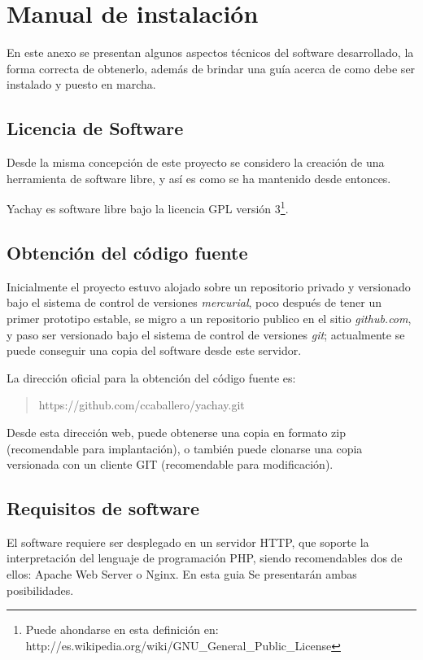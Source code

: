 \chapter{Manual de instalación}
En este anexo se presentan algunos aspectos técnicos del software desarrollado,
la forma correcta de obtenerlo, además de brindar una guía acerca de como debe
ser instalado y puesto en marcha.

\section{Licencia de Software}
Desde la misma concepción de este proyecto se considero la creación de una
herramienta de software libre, y así es como se ha mantenido desde entonces.

Yachay es software libre bajo la licencia GPL versión 3\footnote{Puede ahondarse
en esta definición en:
http://es.wikipedia.org/wiki/GNU\_General\_Public\_License}.

\section{Obtención del código fuente}
Inicialmente el proyecto estuvo alojado sobre un repositorio privado y
versionado bajo el sistema de control de versiones \emph{mercurial}, poco
después de tener un primer prototipo estable, se migro a un repositorio
publico en el sitio \emph{github.com}, y paso ser versionado bajo el sistema de
control de versiones \emph{git}; actualmente se puede conseguir una copia del
software desde este servidor.

La dirección oficial para la obtención del código fuente es:
\begin{quote}
https://github.com/ccaballero/yachay.git
\end{quote}

Desde esta dirección web, puede obtenerse una copia en formato zip
(recomendable para implantación), o también puede clonarse una copia versionada
con un cliente GIT (recomendable para modificación).

\section{Requisitos de software}
El software requiere ser desplegado en un servidor HTTP, que soporte la
interpretación del lenguaje de programación PHP, siendo recomendables dos de
ellos: Apache Web Server o Nginx. En esta guia Se presentarán ambas
posibilidades.

